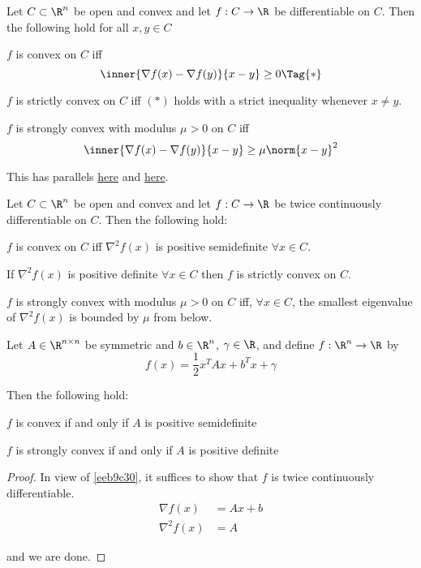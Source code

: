 Let $C\subset\R^n$ be open and convex and let $f:C\to\R$ be differentiable on
$C$. Then the following hold for all $x,y\in C$
\begin{enumerata}
  \item $f$ is convex on $C$ iff
  \begin{equation*}
    \inner{\nabla f(x)-\nabla f(y)}{x-y}\geq0\Tag{*}
  \end{equation*}
  \item $f$ is strictly convex on $C$ iff $(*)$ holds with a strict
  inequality whenever $x\neq y$.
  \item $f$ is strongly convex with modulus $\mu>0$ on $C$ iff
  $$
    \inner{\nabla f(x)-\nabla f(y)}{x-y}\geq\mu\norm{x-y}^2
  $$
\end{enumerata}

This has parallels \href{a114065}{here} and \href{cd9cea7}{here}.

\label{eeb9c30}

Let $C\subset\R^n$ be open and convex and let $f:C\to\R$ be twice continuously
differentiable on $C$. Then the following hold:
\begin{enumerata}
  \def\allx{\forall x\in C}
  \def\hessian{\nabla^2f(x)}
  \item $f$ is convex on $C$ iff $\hessian$ is positive
  semidefinite $\allx$.
  \item If $\hessian$ is positive definite $\allx$ then $f$ is strictly convex
        on $C$.
  \item $f$ is strongly convex with modulus $\mu>0$ on $C$ iff,
  $\allx$, the smallest eigenvalue of $\hessian$ is bounded by $\mu$
  from below.
\end{enumerata}

\label{de25005}

Let $A\in\R^{n\times n}$ be symmetric and $b\in\R^n$, $\gamma\in\R$, and define
$f:\R^n\to\R$ by
$$
  f(x)=\frac12x^TAx+b^Tx+\gamma
$$

Then the following hold:
\begin{enumerata}
  \item $f$ is convex if and only if $A$ is positive semidefinite
  \item $f$ is strongly convex if and only if $A$ is positive definite
\end{enumerata}

\begin{proof}
  In view of \autoref{eeb9c30}, it suffices to show that $f$ is twice
  continuously differentiable.
  \begin{align*}
    \nabla f(x)  &= Ax + b \\
    \nabla^2f(x) &= A
  \end{align*}

  and we are done.
\end{proof}

